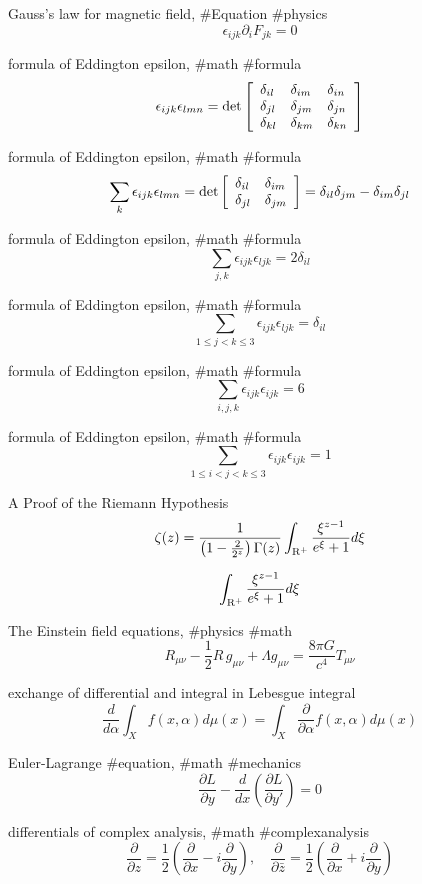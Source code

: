 Gauss’s law for magnetic field, #Equation #physics
$$
\epsilon_{ijk}\partial_i F_{jk}=0
$$

formula of Eddington epsilon, #math #formula
$$
\epsilon_{ijk}\epsilon_{lmn}={\rm det}\left[
\begin{array}{lll}
\delta_{il} & \delta_{im} & \delta_{in} \\
\delta_{jl} & \delta_{jm} & \delta_{jn} \\
\delta_{kl} & \delta_{km} & \delta_{kn} \\
\end{array}
\right]
$$

formula of Eddington epsilon, #math #formula
$$
\sum_k \epsilon_{ijk}\epsilon_{lmn}={\rm det}\left[
\begin{array}{lll}
\delta_{il} & \delta_{im} \\
\delta_{jl} & \delta_{jm} 
\end{array}
\right] =\delta_{il}\delta_{jm}-\delta_{im}\delta_{jl}
$$

formula of Eddington epsilon, #math #formula
$$
\sum_{j,k} \epsilon_{ijk}\epsilon_{ljk}=2\delta_{il}
$$

formula of Eddington epsilon, #math #formula
$$
\sum_{1\le j<k \le 3} \epsilon_{ijk}\epsilon_{ljk}=\delta_{il}
$$

formula of Eddington epsilon, #math #formula
$$
\sum_{i,j,k} \epsilon_{ijk}\epsilon_{ijk}=6
$$

formula of Eddington epsilon, #math #formula
$$
\sum_{1\le i<j<k \le 3} \epsilon_{ijk}\epsilon_{ijk}=1
$$

A Proof of the Riemann Hypothesis
$$
\zeta(z)=\frac{1}{\left(1-\frac{2}{2^z}\right)\Gamma(z)}\int_{{\rm R}^+}\frac{\xi^{z-1}}{e^\xi+1}d\xi
$$

$$
\int_{{\rm R}^+}\frac{\xi^{z-1}}{e^\xi+1}d\xi
$$

The Einstein field equations, #physics #math
$$
R_{\mu\nu}-\frac{1}{2}R \, g_{\mu\nu}+\Lambda g_{\mu\nu}=\frac{8\pi G}{c^4}T_{\mu\nu}
$$

exchange of differential and integral in Lebesgue integral
$$
\frac{d}{d\alpha}\int_X f(x,\alpha)d\mu(x)=\int_X \frac{\partial}{\partial\alpha}f(x,\alpha)d\mu(x)
$$

Euler-Lagrange #equation, #math #mechanics
$$
\frac{\partial L}{\partial y}-\frac{d}{dx}\left(\frac{\partial L}{\partial y'}\right)=0
$$

differentials of complex analysis, #math #complexanalysis
$$
\frac{\partial}{\partial z}=\frac{1}{2}\left(\frac{\partial}{\partial x}-i\frac{\partial}{\partial y}\right), \quad \frac{\partial}{\partial \bar z}=\frac{1}{2}\left(\frac{\partial}{\partial x}+i\frac{\partial}{\partial y}\right)
$$

